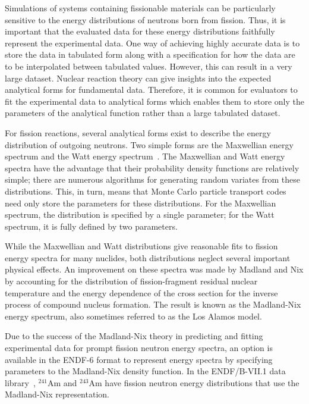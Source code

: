 \documentclass[3p,fleqn]{elsarticle}
\begin{document}
Simulations of systems containing fissionable materials can be particularly
sensitive to the energy distributions of neutrons born from fission. Thus, it is
important that the evaluated data for these energy distributions faithfully
represent the experimental data. One way of achieving highly accurate data is to
store the data in tabulated form along with a specification for how the data are
to be interpolated between tabulated values. However, this can result in a very
large dataset. Nuclear reaction theory can give insights into the expected
analytical forms for fundamental data. Therefore, it is common for evaluators to
fit the experimental data to analytical forms which enables them to store only
the parameters of the analytical function rather than a large tabulated dataset.

For fission reactions, several analytical forms exist to describe the energy
distribution of outgoing neutrons. Two simple forms are the Maxwellian energy
spectrum and the Watt energy spectrum~\cite{physrev-watt-1952}. The Maxwellian
and Watt energy spectra have the advantage that their probability density
functions are relatively simple; there are numerous algorithms for generating
random variates from these distributions. This, in turn, means that Monte Carlo
particle transport codes need only store the parameters for these
distributions. For the Maxwellian spectrum, the distribution is specified by a
single parameter; for the Watt spectrum, it is fully defined by two parameters.

While the Maxwellian and Watt distributions give reasonable fits to fission
energy spectra for many nuclides, both distributions neglect several important
physical effects. An improvement on these spectra was made by Madland and Nix
\cite{nse-madland-1982} by accounting for the distribution of fission-fragment
residual nuclear temperature and the energy dependence of the cross section for
the inverse process of compound nucleus formation. The result is known as the
Madland-Nix energy spectrum, also sometimes referred to as the Los Alamos
model.

Due to the success of the Madland-Nix theory in predicting and fitting
experimental data for prompt fission neutron energy spectra, an option is
available in the ENDF-6 format to represent energy spectra by specifying
parameters to the Madland-Nix density function. In the ENDF/B-VII.1 data
library~\cite{nds-chadwick-2011}, $^{241}$Am and $^{243}$Am have fission neutron
energy distributions that use the Madland-Nix representation.
\end{document}
